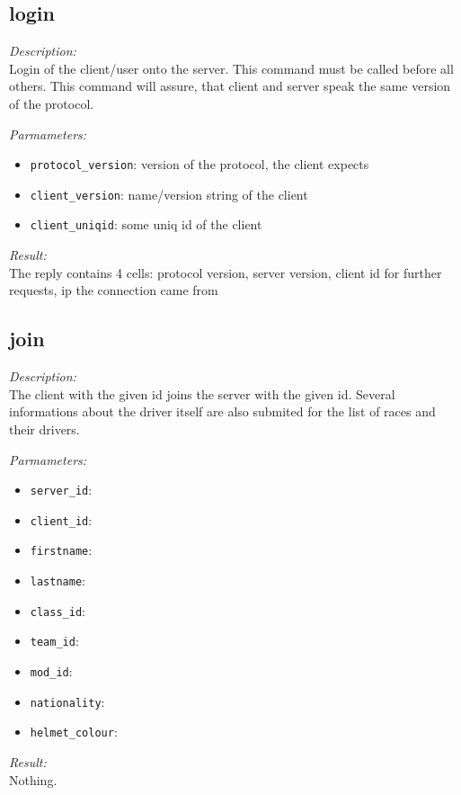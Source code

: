\subsection{login}

\begin{description}
\item {\it Description:}\\
Login of the client/user onto the server. This command must be called before all others. This command will assure, that client and server speak the same version of the protocol.
\item {\it Parmameters:}
\begin{itemize}
\item {\tt protocol\_version}: version of the protocol, the client expects
\item {\tt client\_version}: name/version string of the client
\item {\tt client\_uniqid}: some uniq id of the client
\end{itemize}
\item {\it Result:}\\
The reply contains 4 cells: protocol version, server version, client id for further requests, ip the connection came from
\end{description}

\subsection{join}

\begin{description}
\item {\it Description:}\\
The client with the given id joins the server with the given id. Several informations about the driver itself are also submited for the list of races and their drivers.
\item {\it Parmameters:}
\begin{itemize}
\item {\tt server\_id}: 
\item {\tt client\_id}: 
\item {\tt firstname}: 
\item {\tt lastname}: 
\item {\tt class\_id}: 
\item {\tt team\_id}: 
\item {\tt mod\_id}: 
\item {\tt nationality}: 
\item {\tt helmet\_colour}: 
\end{itemize}
\item {\it Result:}\\
Nothing.
\end{description}

